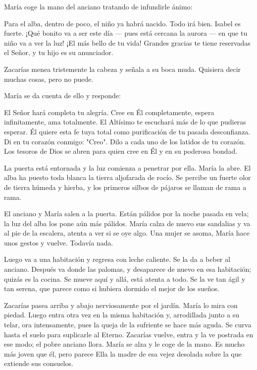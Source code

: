 \documentclass[12pt]{book} %
\begin{document}
María coge la mano del anciano tratando de infundirle ánimo: 

Para el alba, dentro de poco, el niño ya habrá nacido. Todo irá bien. Isabel es fuerte. ¡Qué bonito va a ser este día — pues está cercana la aurora — en que tu niño va a ver la luz! ¡El más bello de tu vida! Grandes gracias te tiene reservadas el Señor, y tu hijo es su anunciador. 

Zacarías menea tristemente la cabeza y señala a su boca muda. Quisiera decir muchas cosas, pero no puede. 

María se da cuenta de ello y responde: 

El Señor hará completa tu alegría. Cree en Él completamente, espera infinitamente, ama totalmente. El Altísimo te escuchará más de lo que pudieras esperar. Él quiere esta fe tuya total como purificación de tu pasada desconfianza. Di en tu corazón conmigo: "Creo". Dilo a cada uno de los latidos de tu corazón. Los tesoros de Dios se abren para quien cree en Él y en su poderosa bondad. 

La puerta está entornada y la luz comienza a penetrar por ella. María la abre. El alba ha puesto toda blanca la tierra aljofarada de rocío. Se percibe un fuerte olor de tierra húmeda y hierba, y los primeros silbos de pájaros se llaman de rama a rama. 

El anciano y María salen a la puerta. Están pálidos por la noche pasada en vela; la luz del alba los pone aún más pálidos. María calza de nuevo sus sandalias y va al pie de la escalera, atenta a ver si se oye algo. Una mujer se asoma, María hace unos gestos y vuelve. Todavía nada. 

Luego va a una habitación y regresa con leche caliente. Se la da a beber al anciano. Después va donde las palomas, y desaparece de nuevo en esa habitación; quizás es la cocina. Se mueve aquí y allá, está atenta a todo. Se la ve tan ágil y tan serena, que parece como si hubiera dormido el mejor de los sueños. 

Zacarías pasea arriba y abajo nerviosamente por el jardín. María lo mira con piedad. Luego entra otra vez en la misma habitación y, arrodillada junto a su telar, ora intensamente, pues la queja de la sufriente se hace más aguda. Se curva hasta el suelo para suplicarle al Eterno. Zacarías vuelve, entra y la ve postrada en ese modo; el pobre anciano llora. María se alza y le coge de la mano. Es mucho más joven que él, pero parece Ella la madre de esa vejez desolada sobre la que extiende sus consuelos. 
\end{document}
